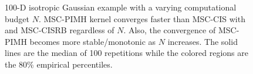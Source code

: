 
\begin{figure}
  \centering
  \caption{100-D isotropic Gaussian example with a varying computational budget \(N\).
    MSC-PIMH kernel converges faster than MSC-CIS with and MSC-CISRB regardless of \(N\).
    Also, the convergence of MSC-PIMH becomes more stable/monotonic as \(N\) increases.
    The solid lines are the median of 100 repetitions while the colored regions are the 80\% empirical percentiles.
  }\label{fig:gaussian}
  \vspace{-0.15in}
\end{figure}

